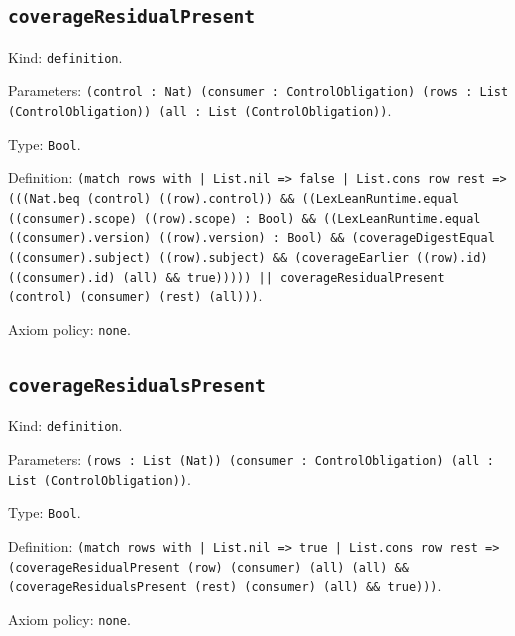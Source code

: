 \documentclass[11pt]{article}
\begin{document}
\subsection*{\texttt{coverageResidualPresent}}
\noindent Kind: \texttt{definition}.\par
\noindent Parameters: \texttt{(control : Nat) (consumer : ControlObligation) (rows : List (ControlObligation)) (all : List (ControlObligation))}.\par
\noindent Type: \texttt{Bool}.\par
\noindent Definition: \texttt{(match rows with | List.nil => false | List.cons row rest => (((Nat.beq (control) ((row).control)) \&\& ((LexLeanRuntime.equal ((consumer).scope) ((row).scope) : Bool) \&\& ((LexLeanRuntime.equal ((consumer).version) ((row).version) : Bool) \&\& (coverageDigestEqual ((consumer).subject) ((row).subject) \&\& (coverageEarlier ((row).id) ((consumer).id) (all) \&\& true))))) || coverageResidualPresent (control) (consumer) (rest) (all)))}.\par
\noindent Axiom policy: \texttt{none}.\par
\subsection*{\texttt{coverageResidualsPresent}}
\noindent Kind: \texttt{definition}.\par
\noindent Parameters: \texttt{(rows : List (Nat)) (consumer : ControlObligation) (all : List (ControlObligation))}.\par
\noindent Type: \texttt{Bool}.\par
\noindent Definition: \texttt{(match rows with | List.nil => true | List.cons row rest => (coverageResidualPresent (row) (consumer) (all) (all) \&\& (coverageResidualsPresent (rest) (consumer) (all) \&\& true)))}.\par
\noindent Axiom policy: \texttt{none}.\par
\end{document}

